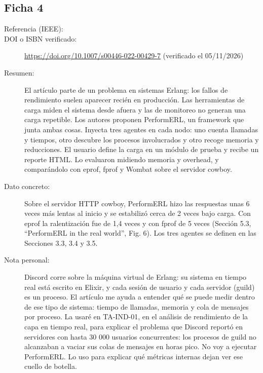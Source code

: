 \subsection{Ficha 4}
\begin{description}
  \item[Referencia (IEEE):] 
  \item[DOI o ISBN verificado:] \url{https://doi.org/10.1007/s00446-022-00429-7} (verificado el 05/11/2026)
  \item[Resumen:] El artículo parte de un problema en sistemas Erlang: los fallos de rendimiento suelen aparecer recién en producción. Las herramientas de carga miden el sistema desde afuera y las de monitoreo no generan una carga repetible. Los autores proponen PerformERL, un framework que junta ambas cosas. Inyecta tres agentes en cada nodo: uno cuenta llamadas y tiempos, otro descubre los procesos involucrados y otro recoge memoria y reducciones. El usuario define la carga en un módulo de prueba y recibe un reporte HTML. Lo evaluaron midiendo memoria y overhead, y comparándolo con eprof, fprof y Wombat sobre el servidor cowboy.
  \item[Dato concreto:] Sobre el servidor HTTP cowboy, PerformERL hizo las respuestas unas 6 veces más lentas al inicio y se estabilizó cerca de 2 veces bajo carga. Con eprof la ralentización fue de 1,4 veces y con fprof de 5 veces (Sección 5.3, \enquote{PerformERL in the real world}, Fig. 6). Los tres agentes se definen en las Secciones 3.3, 3.4 y 3.5.
  \item[Nota personal:] Discord corre sobre la máquina virtual de Erlang: su sistema en tiempo real está escrito en Elixir, y cada sesión de usuario y cada servidor (guild) es un proceso. El artículo me ayuda a entender qué se puede medir dentro de ese tipo de sistema: tiempo de llamadas, memoria y cola de mensajes por proceso. La usaré en TA-IND-01, en el análisis de rendimiento de la capa en tiempo real, para explicar el problema que Discord reportó en servidores con hasta 30 000 usuarios concurrentes: los procesos de guild no alcanzaban a vaciar sus colas de mensajes en horas pico. No voy a ejecutar PerformERL. Lo uso para explicar qué métricas internas dejan ver ese cuello de botella.
\end{description}

